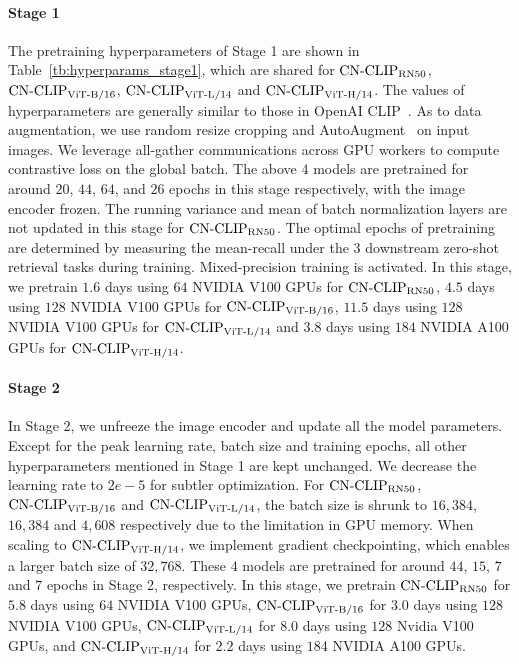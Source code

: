 \paragraph{Stage 1} 
The pretraining hyperparameters of Stage 1 are shown in Table~\ref{tb:hyperparams_stage1}, which are shared for $\text{CN-CLIP}\rm_{RN50}$, $\text{CN-CLIP}\rm_{ViT\text{-}B/16}$, $\text{CN-CLIP}\rm_{ViT\text{-}L/14}$ and $\text{CN-CLIP}\rm_{ViT\text{-}H/14}$. 
The values of hyperparameters are generally similar to those in OpenAI CLIP~\citep{clip}. 
As to data augmentation, we use random resize cropping and AutoAugment~\citep{autoaugment} on input images. We leverage all-gather communications across GPU workers to compute contrastive loss on the global batch. The above $4$ models are pretrained for around $20$, $44$, $64$, and $26$ epochs in this stage respectively, with the image encoder frozen. The running variance and mean of batch normalization layers are not updated in this stage for $\text{CN-CLIP}\rm_{RN50}$. The optimal epochs of pretraining are determined by measuring the mean-recall under the $3$ downstream zero-shot retrieval tasks during training. Mixed-precision training is activated. 
In this stage, we pretrain $1.6$ days using $64$ NVIDIA V100 GPUs for $\text{CN-CLIP}\rm_{RN50}$, $4.5$ days using $128$ NVIDIA V100 GPUs for $\text{CN-CLIP}\rm_{ViT\text{-}B/16}$, $11.5$ days using $128$ NVIDIA V100 GPUs for $\text{CN-CLIP}\rm_{ViT\text{-}L/14}$ and $3.8$ days using $184$ NVIDIA A100 GPUs for $\text{CN-CLIP}\rm_{ViT\text{-}H/14}$.

\paragraph{Stage 2} 
In Stage 2, we unfreeze the image encoder and update all the model parameters. Except for the peak learning rate, batch size and training epochs, all other hyperparameters mentioned in Stage 1 are kept unchanged. We decrease the learning rate to $2e-5$ for subtler optimization. %
For $\text{CN-CLIP}\rm_{RN50}$, $\text{CN-CLIP}\rm_{ViT\text{-}B/16}$ and $\text{CN-CLIP}\rm_{ViT\text{-}L/14}$, the batch size is shrunk to $16,384$, $16,384$ and $4,608$ respectively due to the limitation in GPU memory. When scaling to $\text{CN-CLIP}\rm_{ViT\text{-}H/14}$, we implement gradient checkpointing, which enables a larger batch size of $32,768$. These $4$ models are pretrained for around $44$, $15$, $7$ and $7$ epochs in Stage 2, respectively.
In this stage, we pretrain $\text{CN-CLIP}\rm_{RN50}$ for $5.8$ days using $64$ NVIDIA V100 GPUs, $\text{CN-CLIP}\rm_{ViT\text{-}B/16}$ for $3.0$ days using $128$ NVIDIA V100 GPUs, $\text{CN-CLIP}\rm_{ViT\text{-}L/14}$ for $8.0$ days using $128$ Nvidia V100 GPUs, and $\text{CN-CLIP}\rm_{ViT\text{-}H/14}$ for $2.2$ days using $184$ NVIDIA A100 GPUs. 

